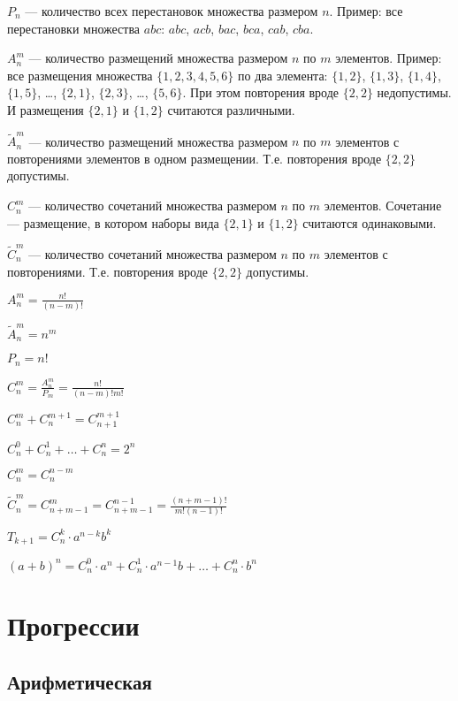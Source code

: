 $ P_n $ --- количество всех перестановок множества размером $ n $. Пример: все перестановки множества $abc$: $abc$, $acb$, $bac$, $bca$, $cab$, $cba$.

$ A^m_n $ --- количество размещений множества размером $ n $ по $ m $ элементов. Пример: все размещения множества $ \{1, 2, 3, 4, 5, 6 \} $ по два элемента: $ \{1, 2\} $, $ \{1, 3\} $, $ \{1, 4\} $, $ \{1, 5\} $, \dots, $ \{2, 1\} $, $ \{2, 3\} $,  \dots, $ \{5, 6\} $. При этом повторения вроде $ \{2, 2\} $ недопустимы. И размещения $ \{2, 1 \} $ и $ \{ 1, 2 \} $ считаются различными.

$ \widetilde{A}^m_n $ --- количество размещений множества размером $ n $ по $ m $ элементов с повторениями элементов в одном размещении. Т.е. повторения вроде $ \{2, 2\} $ допустимы.

$ C^m_n $ --- количество сочетаний множества размером $n$ по $m$ элементов. Сочетание --- размещение, в котором наборы вида $ \{2, 1 \} $ и $ \{ 1, 2 \} $ считаются одинаковыми.

$ \widetilde{C}^m_n $ --- количество сочетаний множества размером $n$ по $m$ элементов с повторениями. Т.е. повторения вроде $ \{2, 2\} $ допустимы.

$ A^m_n = \frac{n!}{(n-m)!} $

$ \widetilde{A}^m_n = n^m $

$ P_n = n! $

$ C^m_n = \frac{A^m_n}{P_m} = \frac{n!}{(n-m)!m!} $

$ C^m_n + C^{m+1}_n = C^{m+1}_{n+1} $

$ C^0_n + C^1_n + \dots + C^n_n = 2^n $

$ C^m_n = C^{n-m}_n $

$ \widetilde{C}^m_n = C^m_{n+m-1} = C^{n-1}_{n+m-1} = \frac{(n+m-1)!}{m!(n-1)!} $

$ T_{k+1} = C^k_n\cdot a^{n-k}b^k $

$ (a+b)^n = C^0_n\cdot a^n + C^1_n\cdot a^{n-1}b + \dots + C^n_n\cdot b^n $

	
\section{Прогрессии}

\subsection{Арифметическая}

